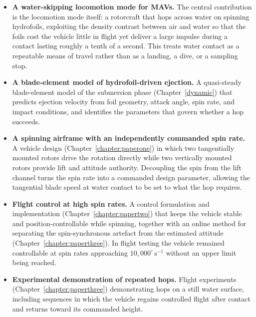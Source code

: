 \begin{itemize}
  \item \textbf{A water-skipping locomotion mode for MAVs.}  The central
    contribution is the locomotion mode itself: a rotorcraft that hops across
    water on spinning hydrofoils, exploiting the density contrast between air
    and water so that the foils cost the vehicle little in flight yet deliver a
    large impulse during a contact lasting roughly a tenth of a second.  This treats
    water contact as a repeatable means of travel rather than as a landing, a
    dive, or a sampling stop.

  \item \textbf{A blade-element model of hydrofoil-driven ejection.}  A
    quasi-steady blade-element model of the submersion phase
    (Chapter~\ref{dynamic}) that predicts ejection velocity from foil geometry,
    attack angle, spin rate, and impact conditions, and identifies the
    parameters that govern whether a hop succeeds.

  \item \textbf{A spinning airframe with an independently commanded spin rate.}
    A vehicle design (Chapter~\ref{chapter:paperone}) in which two tangentially
    mounted rotors drive the rotation directly while two vertically mounted
    rotors provide lift and attitude authority.  Decoupling the spin from the
    lift channel turns the spin rate into a commanded design parameter, allowing
    the tangential blade speed at water contact to be set to what the hop
    requires.

  \item \textbf{Flight control at high spin rates.}  A control formulation and
    implementation (Chapter~\ref{chapter:papertwo}) that keeps the vehicle
    stable and position-controllable while spinning, together with an online
    method for separating the spin-synchronous artefact from the estimated
    attitude (Chapter~\ref{chapter:paperthree}).  In flight testing the vehicle
    remained controllable at spin rates approaching
    $10{,}000^{\circ}\,\mathrm{s^{-1}}$ without an upper limit being reached.

  \item \textbf{Experimental demonstration of repeated hops.}  Flight
    experiments (Chapter~\ref{chapter:paperthree}) demonstrating hops on a still
    water surface, including sequences in which the vehicle regains controlled
    flight after contact and returns toward its commanded height.
\end{itemize}

